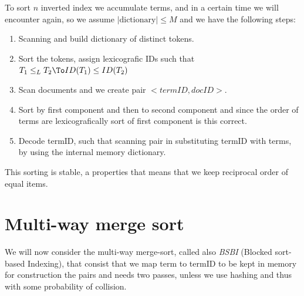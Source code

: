 To sort $n$ inverted index we accumulate terms, and in a certain time we will encounter again, so we 
assume $|\text{dictionary}| \leq M$ and we have the following steps:
\begin{enumerate}
    \item Scanning and build dictionary of distinct tokens.
    \item Sort the tokens, assign lexicografic IDs such that $T_1 \leq_L T_2 \To ID(T_1) \leq ID(T_2)$
    \item Scan documents and we create pair $<term ID, docID>$.
    \item Sort by first component and then to second component and since the order of terms are 
	  lexicografically sort of first component is this correct.
    \item Decode termID, such that scanning pair in substituting termID with terms, by using the internal
	  memory dictionary.
\end{enumerate}
This sorting is stable, a properties that means that we keep reciprocal order of equal items.

\section{Multi-way merge sort}
We will now consider the multi-way merge-sort, called also \emph{BSBI} (Blocked sort-based Indexing), that consist that
we map term to termID to be kept in memory for construction the pairs and needs two passes, unless we use hashing
and thus with some probability of collision.

